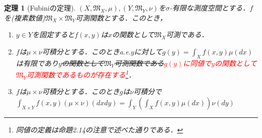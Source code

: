 \documentclass[a4paper,11pt]{jsarticle}
\newtheorem{theorem}[definition]{定理}
\begin{document}
%
%
%
\begin{theorem}[Fubiniの定理]
$(X,\mathfrak{M}_X,\mu ),(Y,\mathfrak{M}_Y,\nu )$を$\sigma$-有限な測度空間とする．$f$を(複素数値)$\mathfrak{M}_X\times\mathfrak{M}_Y$可測関数とする．このとき，
\begin{enumerate}
\renewcommand{\labelenumi}{(\roman{enumi})}
\item $y\in Y$を固定すると$f(x,y)$は$x$の関数として$\mathfrak{M}_X$可測である．
\item $f$は$\mu\times\nu$可積分とする．このときa.e.$y$に対して$g(y)=\int_Xf(x,y)\mu(dx)$は有限であり\sout{$y$の関数として$\mathfrak{M}_Y$可測関数である}\textcolor{red}{$g(y)$に同値で$y$の関数として$\mathfrak{M}_Y$可測関数であるものが存在する}\footnote{同値の定義は命題2.14の注意で述べた通りである．}．
\item $f$は$\mu\times\nu$可積分とする．このとき$g$は$\nu$可積分で$\int_{X\times Y}f(x,y)(\mu\times\nu)(dxdy)=\int_Y\left(\int_Xf(x,y)\mu(dx)\right)\nu(dy)$
\end{enumerate}
\end{theorem}
\end{document}
